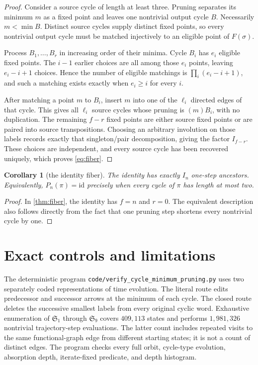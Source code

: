 \documentclass[11pt,a4paper]{amsart}
\newtheorem{corollary}[theorem]{Corollary}
\theoremstyle{definition}
\theoremstyle{remark}
\newcommand{\id}{\mathrm{id}}
\begin{document}
\begin{proof}
Consider a source cycle of length at least three.  Pruning separates its
minimum $m$ as a fixed point and leaves one nontrivial output cycle $B$.
Necessarily $m<\min B$.  Distinct source cycles supply distinct fixed
points, so every nontrivial output cycle must be matched injectively to an
eligible point of $F(\sigma)$.

Process $B_1,\ldots,B_r$ in increasing order of their minima.  Cycle $B_i$
has $e_i$ eligible fixed points.  The $i-1$ earlier choices are all among
those $e_i$ points, leaving $e_i-i+1$ choices.  Hence the number of eligible
matchings is $\prod_i(e_i-i+1)$, and such a matching exists exactly when
$e_i\geq i$ for every $i$.

After matching a point $m$ to $B_i$, insert $m$ into one of the $\ell_i$
directed edges of that cycle.  This gives all $\ell_i$ source cycles whose
pruning is $(m)B_i$, with no duplication.  The remaining $f-r$ fixed points
are either source fixed points or are paired into source transpositions.
Choosing an arbitrary involution on those labels records exactly that
singleton/pair decomposition, giving the factor $I_{f-r}$.  These choices
are independent, and every source cycle has been recovered uniquely, which
proves \eqref{eq:fiber}.
\end{proof}

\begin{corollary}[the identity fiber]\label{cor:identity-fiber}
The identity has exactly $I_n$ one-step ancestors.  Equivalently,
$P_n(\pi)=\id$ precisely when every cycle of $\pi$ has length at most two.
\end{corollary}

\begin{proof}
In \cref{thm:fiber}, the identity has $f=n$ and $r=0$.  The equivalent
description also follows directly from the fact that one pruning step
shortens every nontrivial cycle by one.
\end{proof}

\section{Exact controls and limitations}\label{sec:controls}

The deterministic program
\texttt{code/verify\_cycle\_minimum\_pruning.py} uses two separately coded
representations of time evolution.  The literal route edits predecessor and
successor arrows at the minimum of each cycle.  The closed route deletes the
successive smallest labels from every original cyclic word.  Exhaustive
enumeration of $\mathfrak S_1$ through $\mathfrak S_9$ covers $409{,}113$
states and performs $1{,}981{,}326$ nontrivial trajectory-step evaluations.
The latter count includes repeated visits to the same functional-graph edge
from different starting states; it is not a count of distinct edges.  The
program checks every full orbit, cycle-type evolution, absorption depth,
iterate-fixed predicate, and depth histogram.
\end{document}
